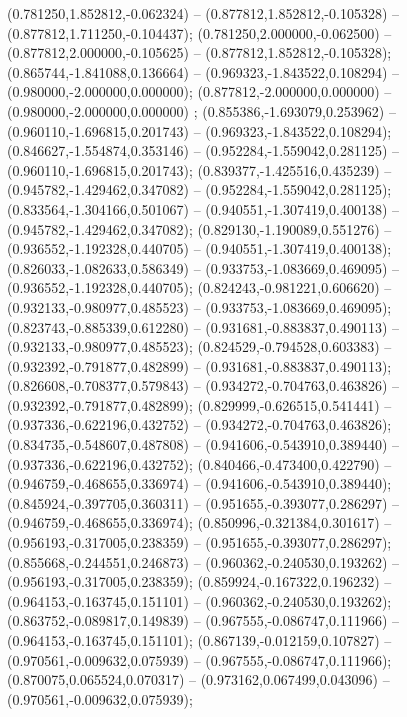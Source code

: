  (0.781250,1.852812,-0.062324) -- (0.877812,1.852812,-0.105328) -- (0.877812,1.711250,-0.104437);
 (0.781250,2.000000,-0.062500) -- (0.877812,2.000000,-0.105625) -- (0.877812,1.852812,-0.105328);
 (0.865744,-1.841088,0.136664) -- (0.969323,-1.843522,0.108294) -- (0.980000,-2.000000,0.000000);
 (0.877812,-2.000000,0.000000) -- (0.980000,-2.000000,0.000000) ;
 (0.855386,-1.693079,0.253962) -- (0.960110,-1.696815,0.201743) -- (0.969323,-1.843522,0.108294);
 (0.846627,-1.554874,0.353146) -- (0.952284,-1.559042,0.281125) -- (0.960110,-1.696815,0.201743);
 (0.839377,-1.425516,0.435239) -- (0.945782,-1.429462,0.347082) -- (0.952284,-1.559042,0.281125);
 (0.833564,-1.304166,0.501067) -- (0.940551,-1.307419,0.400138) -- (0.945782,-1.429462,0.347082);
 (0.829130,-1.190089,0.551276) -- (0.936552,-1.192328,0.440705) -- (0.940551,-1.307419,0.400138);
 (0.826033,-1.082633,0.586349) -- (0.933753,-1.083669,0.469095) -- (0.936552,-1.192328,0.440705);
 (0.824243,-0.981221,0.606620) -- (0.932133,-0.980977,0.485523) -- (0.933753,-1.083669,0.469095);
 (0.823743,-0.885339,0.612280) -- (0.931681,-0.883837,0.490113) -- (0.932133,-0.980977,0.485523);
 (0.824529,-0.794528,0.603383) -- (0.932392,-0.791877,0.482899) -- (0.931681,-0.883837,0.490113);
 (0.826608,-0.708377,0.579843) -- (0.934272,-0.704763,0.463826) -- (0.932392,-0.791877,0.482899);
 (0.829999,-0.626515,0.541441) -- (0.937336,-0.622196,0.432752) -- (0.934272,-0.704763,0.463826);
 (0.834735,-0.548607,0.487808) -- (0.941606,-0.543910,0.389440) -- (0.937336,-0.622196,0.432752);
 (0.840466,-0.473400,0.422790) -- (0.946759,-0.468655,0.336974) -- (0.941606,-0.543910,0.389440);
 (0.845924,-0.397705,0.360311) -- (0.951655,-0.393077,0.286297) -- (0.946759,-0.468655,0.336974);
 (0.850996,-0.321384,0.301617) -- (0.956193,-0.317005,0.238359) -- (0.951655,-0.393077,0.286297);
 (0.855668,-0.244551,0.246873) -- (0.960362,-0.240530,0.193262) -- (0.956193,-0.317005,0.238359);
 (0.859924,-0.167322,0.196232) -- (0.964153,-0.163745,0.151101) -- (0.960362,-0.240530,0.193262);
 (0.863752,-0.089817,0.149839) -- (0.967555,-0.086747,0.111966) -- (0.964153,-0.163745,0.151101);
 (0.867139,-0.012159,0.107827) -- (0.970561,-0.009632,0.075939) -- (0.967555,-0.086747,0.111966);
 (0.870075,0.065524,0.070317) -- (0.973162,0.067499,0.043096) -- (0.970561,-0.009632,0.075939);
